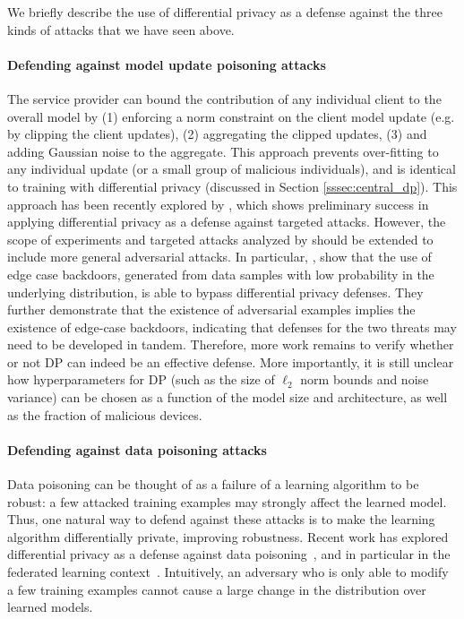 We briefly describe the use of differential privacy as a defense against the three kinds of attacks that we have seen above.

\paragraph{Defending against model update poisoning attacks}
The service provider can bound the contribution of any individual client to the overall model by (1) enforcing a norm constraint on the client model update (e.g. by clipping the client updates), (2) aggregating the clipped updates, (3) and adding Gaussian noise to the aggregate. This approach prevents over-fitting to any individual update (or a small group of malicious individuals), and is identical to training with differential privacy (discussed in Section \ref{sssec:central_dp}). This approach has been recently explored by \citet{sun2019backdoor}, which shows preliminary success in applying differential privacy as a defense against targeted attacks. However, the scope of experiments and targeted attacks analyzed by \citet{sun2019backdoor} should be extended to include more general adversarial attacks. In particular, \citet{wang2020attack}, show that the use of edge case backdoors, generated from data samples with low probability in the underlying distribution, is able to bypass differential privacy defenses. They further demonstrate that the existence of adversarial examples implies the existence of edge-case backdoors, indicating that defenses for the two threats may need to be developed in tandem.  Therefore, more work remains to verify whether or not DP can indeed be an effective defense. More importantly, it is still unclear how hyperparameters for DP (such as the size of $\ell_2$ norm bounds and noise variance) can be chosen as a function of the model size and architecture, as well as the fraction of malicious devices.

\paragraph{Defending against data poisoning attacks}

Data poisoning can be thought of as a failure of a learning algorithm to be robust: a few attacked training examples may strongly affect the learned model. Thus, one natural way to defend against these attacks is to make the learning algorithm differentially private, improving robustness. Recent work has explored differential privacy as a defense against data poisoning~\citep{MZH19}, and in particular in the federated learning context~\citep{geyer2017differentiallyyer}. Intuitively, an adversary who is only able to modify a few training examples cannot cause a large change in the distribution over learned models.

